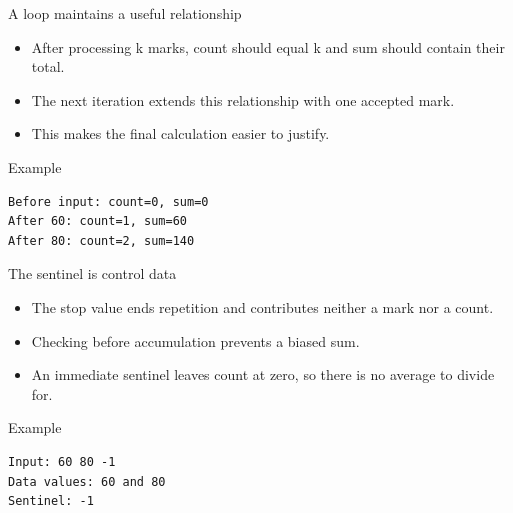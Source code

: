 \documentclass[10pt,aspectratio=169]{beamer}
\begin{document}
\begin{frame}[fragile,t]{A loop maintains a useful relationship}
\begin{itemize}
\item After processing k marks, count should equal k and sum should contain their total.
\item The next iteration extends this relationship with one accepted mark.
\item This makes the final calculation easier to justify.
\end{itemize}
\vspace{1mm}\begin{block}{Example}
\begin{lstlisting}
Before input: count=0, sum=0
After 60: count=1, sum=60
After 80: count=2, sum=140
\end{lstlisting}
\end{block}
\end{frame}

\begin{frame}[fragile,t]{The sentinel is control data}
\begin{itemize}
\item The stop value ends repetition and contributes neither a mark nor a count.
\item Checking before accumulation prevents a biased sum.
\item An immediate sentinel leaves count at zero, so there is no average to divide for.
\end{itemize}
\vspace{1mm}\begin{block}{Example}
\begin{lstlisting}
Input: 60 80 -1
Data values: 60 and 80
Sentinel: -1
\end{lstlisting}
\end{block}
\end{frame}
\end{document}

